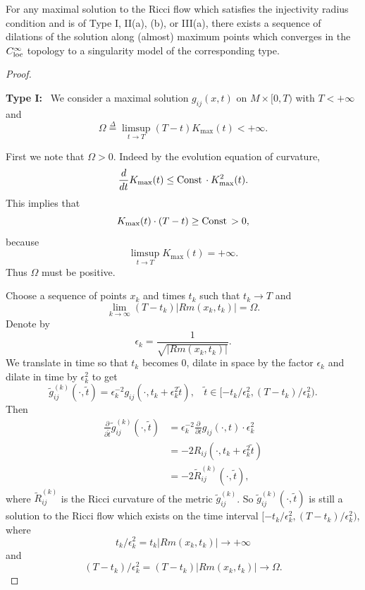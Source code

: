 \begin{theorem}
  \label{thm:cz-existence-of-dilation-limit-singularity-models}
For any maximal solution to the Ricci flow which satisfies the
injectivity radius condition and is of Type {\rm I, II(a), (b),}
or {\rm III(a),} there exists a sequence of dilations of the
solution along (almost) maximum points which converges in the
$C_{\rm loc}^{\infty}$ topology to a singularity model of the
corresponding type.
\end{theorem}

\begin{proof} \

\smallskip
{\bf Type I:} \ We consider a maximal solution
$g_{ij}(x,t)$ on $M\times [0,T)$ with $T<+\infty$ and
$$
\Omega\stackrel{\Delta}{=}\limsup_{t\rightarrow T}
(T-t)K_{\max}(t)<+\infty.
$$

First we note that $\Omega>0$. Indeed by the evolution equation of
curvature,
$$
\frac{d}{dt}K_{\max}(t)\leq{\rm Const}\, \cdot K_{\max}^2(t).
$$
This implies that
$$
K_{\max}(t)\cdot (T-t)\geq {\rm Const}\, >0,
$$
because
$$
\limsup_{t\rightarrow T}K_{\max}(t)=+\infty.
$$
Thus $\Omega$ must be positive.

Choose a sequence of points $x_k$ and times $t_k$ such that
$t_k\rightarrow T$ and
$$
\lim_{k\rightarrow \infty}(T-t_k)|Rm(x_k,t_k)|=\Omega.
$$
Denote by
$$
\epsilon_k=\frac{1}{\sqrt{|Rm(x_k,t_k)|}}.
$$
We translate in time so that $t_k$ becomes 0, dilate in space by
the factor $\epsilon_k$ and dilate in time by $\epsilon_k^2$ to
get
$$
\tilde{g}_{ij}^{(k)}(\cdot,\tilde{t})
=\epsilon_k^{-2}g_{ij}(\cdot,t_k+\epsilon_k^2\tilde{t}),\ \ \ \
\tilde{t}\in [-t_k/\epsilon_k^2, (T-t_k)/\epsilon_k^2).
$$
Then
\begin{align*}
\frac{\partial}{\partial
\tilde{t}}\tilde{g}_{ij}^{(k)}(\cdot,\tilde{t})& =
\epsilon_k^{-2}\frac{\partial
}{\partial t}g_{ij}(\cdot,t)\cdot \epsilon_k^2 \\
&  = -2R_{ij}(\cdot,t_k+\epsilon_k^2\tilde{t}) \\
&  = -2\tilde{R}_{ij}^{(k)}(\cdot,\tilde{t}),
\end{align*}
where $\tilde{R}_{ij}^{(k)}$ is the Ricci curvature of the metric
$\tilde{g}_{ij}^{(k)}$. So $\tilde{g}_{ij}^{(k)}(\cdot,\tilde{t})$
is still a solution to the Ricci flow which exists on the time
interval $[-t_k/\epsilon_k^2,(T-t_k)/\epsilon_k^2)$, where
$$
t_k/\epsilon_k^2=t_k|Rm(x_k,t_k)|\to +\infty
$$
and
$$
(T-t_k)/\epsilon_k^2=(T-t_k)|Rm(x_k,t_k)|\to \Omega.
$$


\end{proof}
